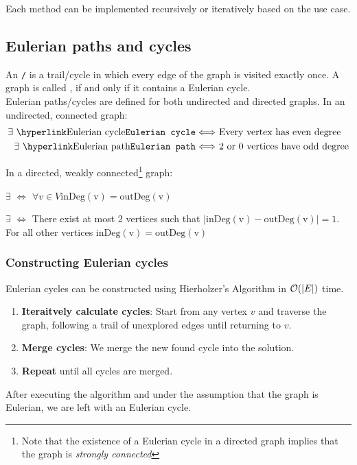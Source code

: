 \documentclass[a3paper, landscape, 11pt]{article} %
\begin{document}
\begin{multicols*}{4}
Each method can be implemented recursively or iteratively based on the use case.
\vfill

\newpage
\subsection*{Eulerian paths and cycles}
An \texttt{/} is a trail/cycle in which every edge of the graph is visited exactly once. A graph is called , if and only if it contains a Eulerian cycle.\\

Eulerian paths/cycles are defined for both undirected and directed graphs. In an undirected, connected graph:
\begin{align*}
	\text{$\exists$ \key{Eulerian cycle}} \Longleftrightarrow & \text{ Every vertex has even degree} \\
	\text{$\exists$ \key{Eulerian path}} \Longleftrightarrow & \text{ $2$ or $0$ vertices have odd degree}
\end{align*}	

In a directed, weakly connected\footnote{Note that the existence of a Eulerian cycle in a directed graph implies that the graph is \textit{strongly connected}} graph:

\bigskip
$\exists$  $\Longleftrightarrow$ $\forall v\in V \operatorname{inDeg(v)}=\operatorname{outDeg(v)}$ 

\smallskip
$\exists$  $\Longleftrightarrow$ There exist at most 2 vertices such that $| \operatorname{inDeg(v)}-\operatorname{outDeg(v)}| = 1$. For all other vertices $\operatorname{inDeg(v)} =\operatorname{outDeg(v)}$

\subsubsection*{Constructing Eulerian cycles}
Eulerian cycles can be constructed using Hierholzer's Algorithm in $\mathcal{O}(|E|)$ time.
\begin{enumerate}[noitemsep]
	\item \textbf{Iteraitvely calculate cycles}: Start from any vertex $v$ and traverse the graph, following a trail of unexplored edges until returning to $v$. 
	\item \textbf{Merge cycles}: We merge the new found cycle into the solution.
	\item \textbf{Repeat} until all cycles are merged.
\end{enumerate}
After executing the algorithm and under the assumption that the graph is Eulerian, we are left with an Eulerian cycle.


\end{multicols*}
\end{document}
